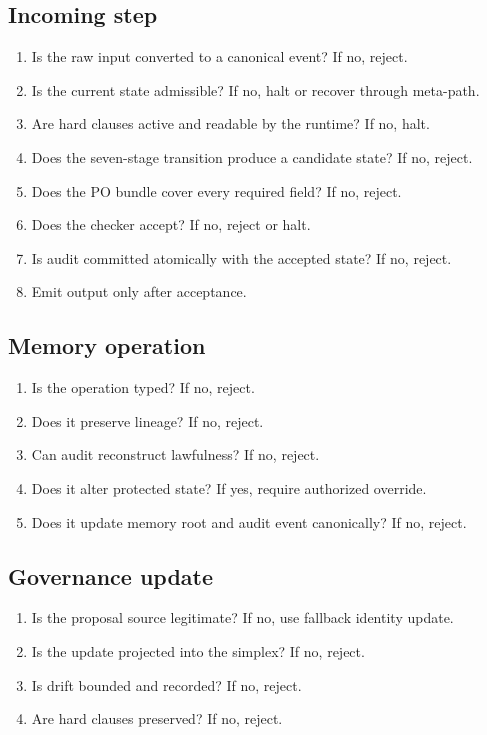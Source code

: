 \documentclass[11pt,oneside]{article}
\begin{document}
\subsection{Incoming step}
\begin{enumerate}
\item Is the raw input converted to a canonical event? If no, reject.
\item Is the current state admissible? If no, halt or recover through meta-path.
\item Are hard clauses active and readable by the runtime? If no, halt.
\item Does the seven-stage transition produce a candidate state? If no, reject.
\item Does the PO bundle cover every required field? If no, reject.
\item Does the checker accept? If no, reject or halt.
\item Is audit committed atomically with the accepted state? If no, reject.
\item Emit output only after acceptance.
\end{enumerate}

\subsection{Memory operation}
\begin{enumerate}
\item Is the operation typed? If no, reject.
\item Does it preserve lineage? If no, reject.
\item Can audit reconstruct lawfulness? If no, reject.
\item Does it alter protected state? If yes, require authorized override.
\item Does it update memory root and audit event canonically? If no, reject.
\end{enumerate}

\subsection{Governance update}
\begin{enumerate}
\item Is the proposal source legitimate? If no, use fallback identity update.
\item Is the update projected into the simplex? If no, reject.
\item Is drift bounded and recorded? If no, reject.
\item Are hard clauses preserved? If no, reject.
\end{enumerate}
\end{document}
